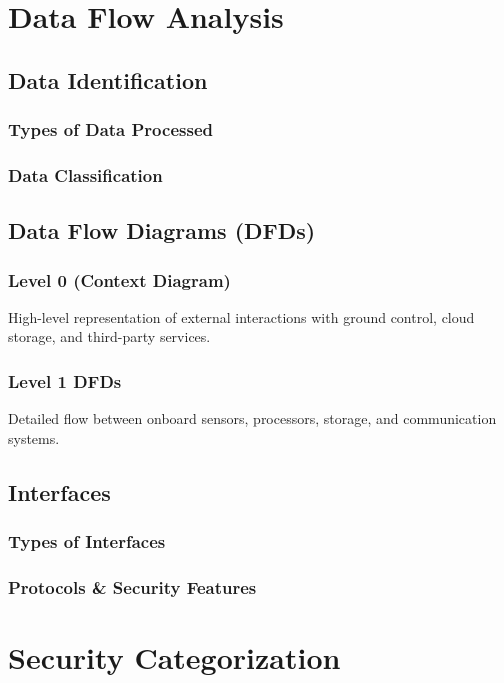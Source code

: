 \documentclass{article}
\begin{document}
\section{Data Flow Analysis}

\subsection{Data Identification}
\subsubsection{Types of Data Processed}

\subsubsection{Data Classification}

\subsection{Data Flow Diagrams (DFDs)}
\subsubsection{Level 0 (Context Diagram)}
High-level representation of external interactions with ground control, cloud storage, and third-party services.

\subsubsection{Level 1 DFDs}
Detailed flow between onboard sensors, processors, storage, and communication systems.

\subsection{Interfaces}
\subsubsection{Types of Interfaces}

\subsubsection{Protocols \& Security Features}

\section{Security Categorization}
\end{document}
